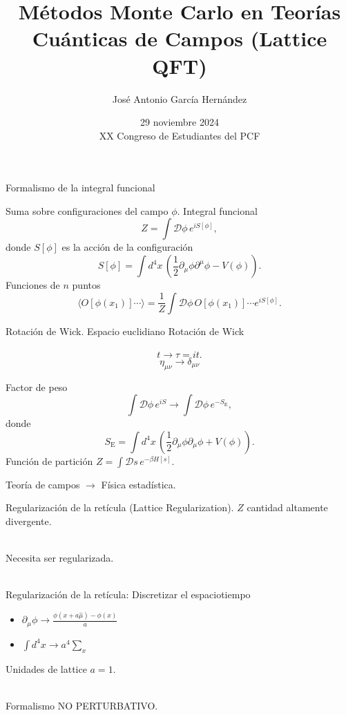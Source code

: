 \documentclass[11pt]{beamer}
\author{José Antonio García Hernández}
\title{Métodos Monte Carlo en Teorías Cuánticas de Campos (Lattice QFT)}
\institute{Instituto de Ciencias Nucleares, UNAM}
\date{29 noviembre 2024 \\ XX Congreso de Estudiantes del PCF}
\begin{document}
\begin{frame}
\titlepage
\end{frame}


\begin{frame}{Formalismo de la integral funcional}

    Suma sobre configuraciones del campo $\phi$. Integral funcional
    $$Z = \int \mathcal{D}\phi \, e^{iS[\phi]},$$
    donde $S[\phi]$ es la acción de la configuración
    $$ S[\phi] = \int d^4 x \, \left( \frac{1}{2}\partial_{\mu}\phi \partial^{\mu}\phi - V(\phi)\right).$$
    Funciones de $n$ puntos
    $$ \langle O[\phi(x_1)] \cdots \rangle =  \frac{1}{Z}\int \mathcal{D}\phi \, O[\phi(x_1)]\cdots e^{iS[\phi]}.$$
\end{frame}

\begin{frame}{Rotación de Wick. Espacio euclidiano}
    Rotación de Wick \\~
    $$ t \to \tau = i t.$$
    $$ \eta_{\mu\nu} \to \delta_{\mu\nu}$$
        
    Factor de peso 
        $$ \int \mathcal{D}\phi \, e^{iS} \to  \int \mathcal{D}\phi \, e^{-S_{\text{E}}},$$
        donde 
        $$ S_{\text{E}} = \int d^4 x \, \left( \frac{1}{2}\partial_{\mu}\phi \partial_{\mu}\phi + V(\phi)\right).$$
        Función de partición $ Z = \int \mathcal{D}s\, e^{-\beta H[s]}$.
        
        Teoría de campos $\to$ Física estadística. 
\end{frame}

\begin{frame}{Regularización de la retícula (Lattice Regularization).}
    $Z$ cantidad altamente divergente.\\~
    
    Necesita ser regularizada. \\~
    
    Regularización de la retícula:
    Discretizar el espaciotiempo
    \begin{itemize}
         \item $\displaystyle\partial_\mu\phi \to \frac{\phi(x + a\hat{\mu}) - \phi(x)}{a}$
         \item $\displaystyle\int d^4x \to a^4\sum_{x}$
    \end{itemize}
    
    Unidades de lattice $a = 1$. \\~
    
    Formalismo NO PERTURBATIVO.
\end{frame}
\end{document}
